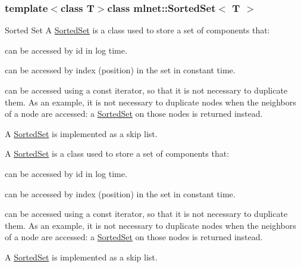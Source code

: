 \subsubsection*{template$<$class T$>$class mlnet\+::\+Sorted\+Set$<$ T $>$}

Sorted Set A \hyperlink{classmlnet_1_1_sorted_set}{Sorted\+Set} is a class used to store a set of components that\+:
\begin{DoxyEnumerate}
\item can be accessed by id in log time.
\item can be accessed by index (position) in the set in constant time.
\item can be accessed using a const iterator, so that it is not necessary to duplicate them. As an example, it is not necessary to duplicate nodes when the neighbors of a node are accessed\+: a \hyperlink{classmlnet_1_1_sorted_set}{Sorted\+Set} on those nodes is returned instead.
\end{DoxyEnumerate}

A \hyperlink{classmlnet_1_1_sorted_set}{Sorted\+Set} is implemented as a skip list.

A \hyperlink{classmlnet_1_1_sorted_set}{Sorted\+Set} is a class used to store a set of components that\+:
\begin{DoxyEnumerate}
\item can be accessed by id in log time.
\item can be accessed by index (position) in the set in constant time.
\item can be accessed using a const iterator, so that it is not necessary to duplicate them. As an example, it is not necessary to duplicate nodes when the neighbors of a node are accessed\+: a \hyperlink{classmlnet_1_1_sorted_set}{Sorted\+Set} on those nodes is returned instead.
\end{DoxyEnumerate}

A \hyperlink{classmlnet_1_1_sorted_set}{Sorted\+Set} is implemented as a skip list. 

